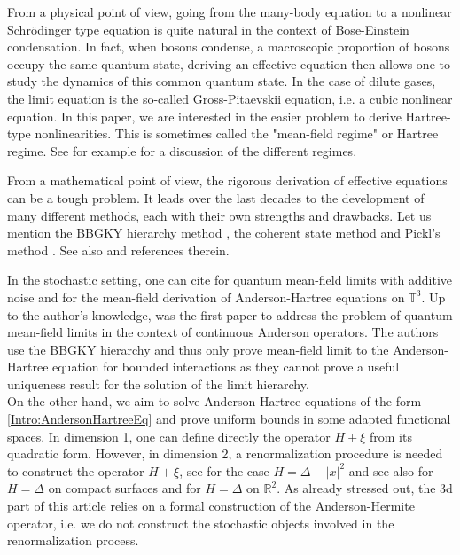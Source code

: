 \documentclass{article}
\def\R{\mathbb R}
\def\T{\mathbb T}
\theoremstyle{definition}
\numberwithin{equation}{section}
\begin{document}
From a physical point of view, going from the many-body equation to a nonlinear Schrödinger type equation is quite natural in the context of Bose-Einstein condensation. In fact, when bosons condense, a macroscopic proportion of bosons occupy the same quantum state, deriving an effective equation then allows one to study the dynamics of this common quantum state. In the case of dilute gases, the limit equation is the so-called Gross-Pitaevskii equation, i.e. a cubic nonlinear equation. In this paper, we are interested in the easier problem to derive Hartree-type nonlinearities. This is sometimes called the "mean-field regime" or Hartree regime. See for example \cite{RougerieRewiewNBody} for a discussion of the different regimes.

From a mathematical point of view, the rigorous derivation of effective equations can be a tough problem. It leads over the last decades to the development of many different methods, each with their own strengths and drawbacks. Let us mention the BBGKY hierarchy method \cite{spohn1980kinetic,bardos2000weak,erdos2001derivation}, the coherent state method \cite{Hepp1974,RodnianskiQuantumFluctuations} and Pickl's method \cite{PicklKnowles,PicklSimple}. See also \cite{GolseReviex,BenedikterReviewMeanField,RougerieRewiewNBody} and references therein. 

In the stochastic setting, one can cite \cite{kolokoltsov2021law,kolokoltsov2022quantum,deBouardGuoHerouard2025} for quantum mean-field limits with additive noise and \cite{Zachhuber3dAndersonHartreeMeanField} for the mean-field derivation of Anderson-Hartree equations on $\T^3$. Up to the author's knowledge, \cite{Zachhuber3dAndersonHartreeMeanField} was the first paper to address the problem of quantum mean-field limits in the context of continuous Anderson operators. The authors use the BBGKY hierarchy and thus only prove mean-field limit to the Anderson-Hartree equation for bounded interactions as they cannot prove a useful uniqueness result for the solution of the limit hierarchy.\\


On the other hand, we aim to solve Anderson-Hartree equations of the form \cref{Intro:AndersonHartreeEq} and prove uniform bounds in some adapted functional spaces. In dimension 1, one can define directly the operator $H+\xi$ from its quadratic form. However, in dimension 2, a renormalization procedure is needed to construct the operator $H+\xi$, see \cite{Mackowiak_2025,MackowiakStrichartzConfAnderson} for the case $H=\Delta-|x|^2$ and see also \cite{allez2015continuous,Labb__2019,mouzard2021weyl,bailleul2022analysis,mouzard2023simple} for $H=\Delta$ on compact surfaces and \cite{UEKI2025104642,hsu2024construction} for $H=\Delta$ on $\R^2$. As already stressed out, the 3d part of this article relies on a formal construction of the Anderson-Hermite operator, i.e. we do not construct the stochastic objects involved in the renormalization process.
\end{document}
